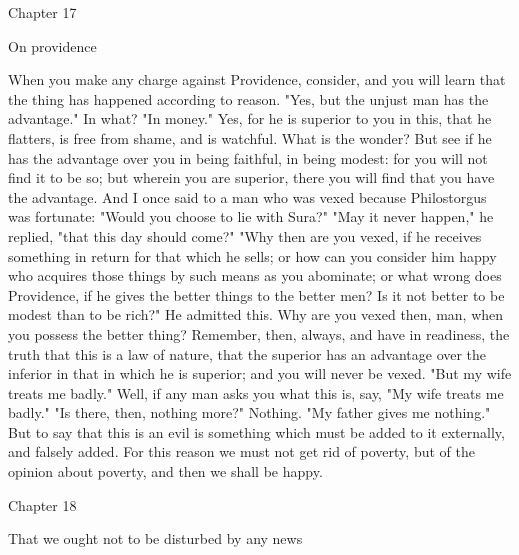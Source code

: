 \documentclass[a4paper]{article}
\begin{document}
Chapter 17

On providence

    When you make any charge against Providence, consider, and you will learn
that the thing has happened according to reason. "Yes, but the unjust man has
the advantage." In what? "In money." Yes, for he is superior to you in this,
that he flatters, is free from shame, and is watchful. What is the wonder? But
see if he has the advantage over you in being faithful, in being modest: for
you will not find it to be so; but wherein you are superior, there you will
find that you have the advantage. And I once said to a man who was vexed
because Philostorgus was fortunate: "Would you choose to lie with Sura?" "May
it never happen," he replied, "that this day should come?" "Why then are you
vexed, if he receives something in return for that which he sells; or how can
you consider him happy who acquires those things by such means as you
abominate; or what wrong does Providence, if he gives the better things to the
better men? Is it not better to be modest than to be rich?" He admitted this.
Why are you vexed then, man, when you possess the better thing? Remember, then,
always, and have in readiness, the truth that this is a law of nature, that the
superior has an advantage over the inferior in that in which he is superior;
and you will never be vexed.
    "But my wife treats me badly." Well, if any man asks you what this is, say,
"My wife treats me badly." "Is there, then, nothing more?" Nothing. "My father
gives me nothing." But to say that this is an evil is something which must be
added to it externally, and falsely added. For this reason we must not get rid
of poverty, but of the opinion about poverty, and then we shall be happy.

Chapter 18

That we ought not to be disturbed by any news
\end{document}
